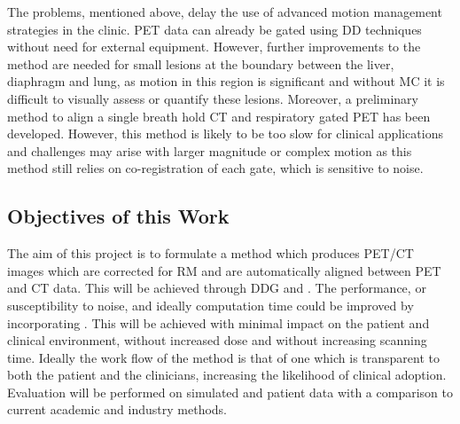         The problems, mentioned above, delay the use of advanced motion management strategies in the clinic. \gls{PET} data can already be gated using \gls{DD} techniques without need for external equipment. However, further improvements to the method are needed for small lesions at the boundary between the liver, diaphragm and lung, as motion in this region is significant and without \gls{MC} it is difficult to visually assess or quantify these lesions. Moreover, a preliminary method to align a single breath hold \gls{CT} and respiratory gated \gls{PET} has been developed. However, this method is likely to be too slow for clinical applications and challenges may arise with larger magnitude or complex motion as this method still relies on co-registration of each gate, which is sensitive to noise.
            
        \subsection{Objectives of this Work} \label{sec:objectives_of_this_work}
            The aim of this project is to formulate a method which produces \gls{PET}/\gls{CT} images which are corrected for \gls{RM} and are automatically aligned between \gls{PET} and \gls{CT} data. This will be achieved through \gls{DDG} and . %
            The performance, or susceptibility to noise, and ideally computation time could be improved by incorporating . This will be achieved with minimal impact on the patient and clinical environment, without increased dose and without increasing scanning time. Ideally the work flow of the method is that of one which is transparent to both the patient and the clinicians, increasing the likelihood of clinical adoption. Evaluation will be performed on simulated and patient data with a comparison to current academic and industry methods.
        
        
